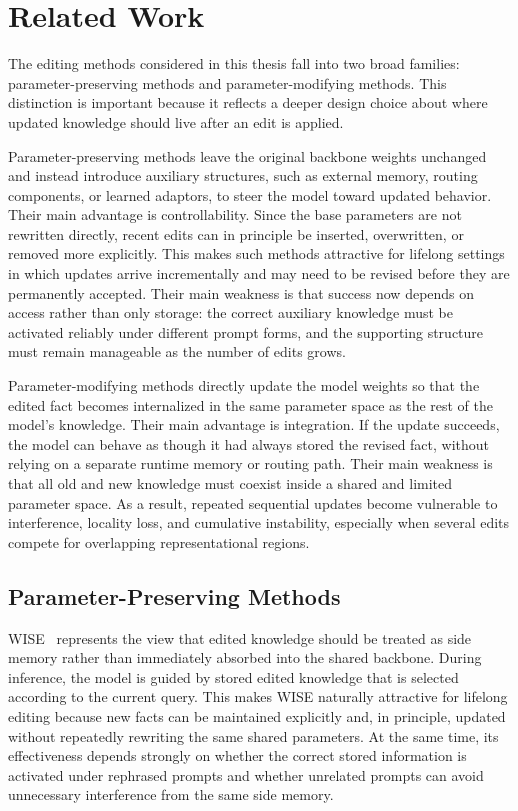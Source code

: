 \section{Related Work}

The editing methods considered in this thesis fall into two broad families: parameter-preserving methods and parameter-modifying methods. This distinction is important because it reflects a deeper design choice about where updated knowledge should live after an edit is applied.

Parameter-preserving methods leave the original backbone weights unchanged and instead introduce auxiliary structures, such as external memory, routing components, or learned adaptors, to steer the model toward updated behavior. Their main advantage is controllability. Since the base parameters are not rewritten directly, recent edits can in principle be inserted, overwritten, or removed more explicitly. This makes such methods attractive for lifelong settings in which updates arrive incrementally and may need to be revised before they are permanently accepted. Their main weakness is that success now depends on access rather than only storage: the correct auxiliary knowledge must be activated reliably under different prompt forms, and the supporting structure must remain manageable as the number of edits grows.

Parameter-modifying methods directly update the model weights so that the edited fact becomes internalized in the same parameter space as the rest of the model's knowledge. Their main advantage is integration. If the update succeeds, the model can behave as though it had always stored the revised fact, without relying on a separate runtime memory or routing path. Their main weakness is that all old and new knowledge must coexist inside a shared and limited parameter space. As a result, repeated sequential updates become vulnerable to interference, locality loss, and cumulative instability, especially when several edits compete for overlapping representational regions.

\subsection{Parameter-Preserving Methods}

WISE~\cite{wang2024wise} represents the view that edited knowledge should be treated as side memory rather than immediately absorbed into the shared backbone. During inference, the model is guided by stored edited knowledge that is selected according to the current query. This makes WISE naturally attractive for lifelong editing because new facts can be maintained explicitly and, in principle, updated without repeatedly rewriting the same shared parameters. At the same time, its effectiveness depends strongly on whether the correct stored information is activated under rephrased prompts and whether unrelated prompts can avoid unnecessary interference from the same side memory.

